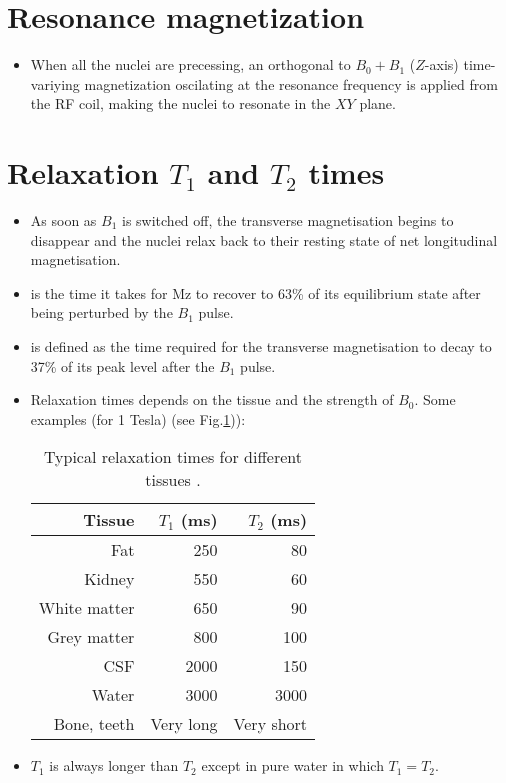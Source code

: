 \section{Resonance magnetization}
\begin{itemize}
\item When all the nuclei are precessing, an orthogonal to $B_0+B_1$
  ($Z$-axis) time-variying magnetization oscilating at the resonance
  frequency is applied from the RF coil, making the nuclei to resonate
  in the $XY$ plane.
\end{itemize}

\section{Relaxation $T_1$ and $T_2$ times}
\begin{itemize}
\item As soon as $B_1$ is switched off, the transverse magnetisation
  begins to disappear and the nuclei relax back to their resting state
  of net longitudinal magnetisation. 
\item {} is the time it takes for Mz to recover to 63\% of its
  equilibrium state after being perturbed by the $B_1$ pulse.
\item {} is
  defined as the time required for the transverse magnetisation to
  decay to 37\% of its peak level after the $B_1$ pulse.
\end{itemize}

\begin{itemize}
\item Relaxation times depends on the tissue and the strength of
  $B_0$. Some examples (for 1 Tesla) (see Fig.\ref{tab:relaxation_times})):
  \begin{table}
    \begin{center}
      \begin{tabular}{r|rr}
        Tissue & $T_1$ (ms) & $T_2$ (ms) \\
        \hline
        Fat & 250 & 80 \\
        Kidney & 550 &  60 \\
        White matter & 650 & 90 \\
        Grey matter & 800 & 100 \\
        CSF & 2000 & 150 \\
        Water & 3000 & 3000 \\
        Bone, teeth & Very long & Very short
      \end{tabular}
      \caption{Typical relaxation times for different tissues
        \cite{abdulla2025MRI_T1T2}.}
      \label{tab:relaxation_times}
    \end{center}
  \end{table}
\item $T_1$ is always longer than $T_2$ except in pure water in which
  $T_1=T_2$.
\end{itemize}

